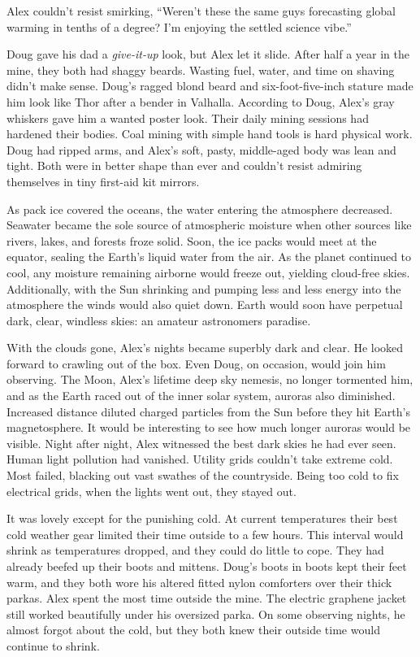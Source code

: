 Alex couldn't resist smirking, ``Weren't these the same guys forecasting
global warming in tenths of a degree? I'm enjoying the settled science
vibe.''

Doug gave his dad a \emph{give-it-up} look, but Alex let it slide. After
half a year in the mine, they both had shaggy beards. Wasting fuel,
water, and time on shaving didn't make sense. Doug's ragged blond beard
and six-foot-five-inch stature made him look like Thor after a bender in
Valhalla. According to Doug, Alex's gray whiskers gave him a wanted
poster look. Their daily mining sessions had hardened their bodies. Coal
mining with simple hand tools is hard physical work. Doug had ripped
arms, and Alex's soft, pasty, middle-aged body was lean and tight. Both
were in better shape than ever and couldn't resist admiring themselves
in tiny first-aid kit mirrors.

As pack ice covered the oceans, the water entering the atmosphere
decreased. Seawater became the sole source of atmospheric moisture when
other sources like rivers, lakes, and forests froze solid. Soon, the ice
packs would meet at the equator, sealing the Earth's liquid water from
the air. As the planet continued to cool, any moisture remaining
airborne would freeze out, yielding cloud-free skies. Additionally, with
the Sun shrinking and pumping less and less energy into the atmosphere
the winds would also quiet down. Earth would soon have perpetual dark,
clear, windless skies: an amateur astronomers paradise.

With the clouds gone, Alex's nights became superbly dark and clear. He
looked forward to crawling out of the box. Even Doug, on occasion, would
join him observing. The Moon, Alex's lifetime deep sky nemesis, no
longer tormented him, and as the Earth raced out of the inner solar
system, auroras also diminished. Increased distance diluted charged
particles from the Sun before they hit Earth's magnetosphere. It would
be interesting to see how much longer auroras would be visible. Night
after night, Alex witnessed the best dark skies he had ever seen. Human
light pollution had vanished. Utility grids couldn't take extreme cold.
Most failed, blacking out vast swathes of the countryside. Being too
cold to fix electrical grids, when the lights went out, they stayed out.

It was lovely except for the punishing cold. At current temperatures
their best cold weather gear limited their time outside to a few hours.
This interval would shrink as temperatures dropped, and they could do
little to cope. They had already beefed up their boots and mittens.
Doug's boots in boots kept their feet warm, and they both wore his
altered fitted nylon comforters over their thick parkas. Alex spent the
most time outside the mine. The electric graphene jacket still worked
beautifully under his oversized parka. On some observing nights, he
almost forgot about the cold, but they both knew their outside time
would continue to shrink.

